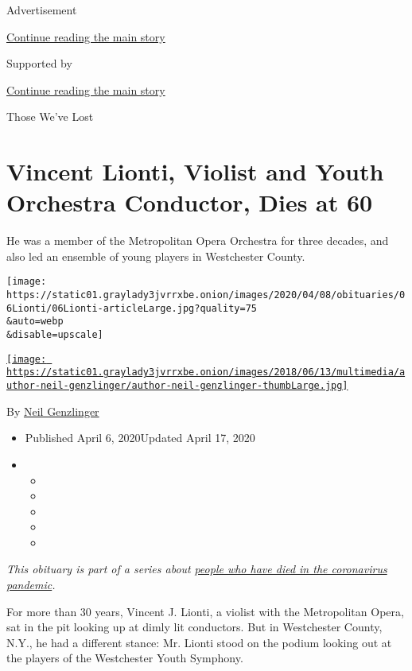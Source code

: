 Advertisement

\protect\hyperlink{after-top}{Continue reading the main story}

Supported by

\protect\hyperlink{after-sponsor}{Continue reading the main story}

Those We've Lost

\hypertarget{vincent-lionti-violist-and-youth-orchestra-conductor-dies-at-60}{%
\section{Vincent Lionti, Violist and Youth Orchestra Conductor, Dies at
60}\label{vincent-lionti-violist-and-youth-orchestra-conductor-dies-at-60}}

He was a member of the Metropolitan Opera Orchestra for three decades,
and also led an ensemble of young players in Westchester County.

\texttt{[image: https://static01.graylady3jvrrxbe.onion/images/2020/04/08/obituaries/06Lionti/06Lionti-articleLarge.jpg?quality=75\\\&auto=webp\\\&disable=upscale]}

\href{https://www.nytimes3xbfgragh.onion/by/neil-genzlinger}{\texttt{[image: https://static01.graylady3jvrrxbe.onion/images/2018/06/13/multimedia/author-neil-genzlinger/author-neil-genzlinger-thumbLarge.jpg]}}

By \href{https://www.nytimes3xbfgragh.onion/by/neil-genzlinger}{Neil
Genzlinger}

\begin{itemize}
\item
  Published April 6, 2020Updated April 17, 2020
\item
  \begin{itemize}
  \item
  \item
  \item
  \item
  \item
  \end{itemize}
\end{itemize}

\emph{This obituary is part of a series about}
\href{https://www.nytimes3xbfgragh.onion/series/people-who-have-died-of-the-coronavirus}{\emph{people
who have died in the coronavirus pandemic}}\emph{.}

For more than 30 years, Vincent J. Lionti, a violist with the
Metropolitan Opera, sat in the pit looking up at dimly lit conductors.
But in Westchester County, N.Y., he had a different stance: Mr. Lionti
stood on the podium looking out at the players of the Westchester Youth
Symphony.

